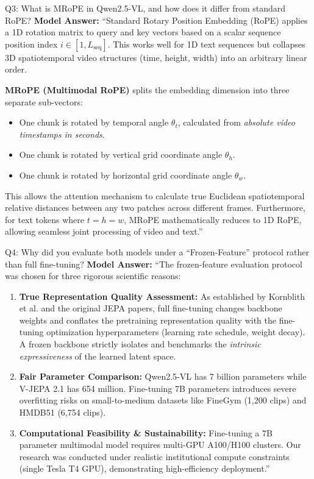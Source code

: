 \documentclass[a4paper, 11pt]{article}
\begin{document}
\vspace{0.2cm}

\begin{defensebox}{Q3: What is MRoPE in Qwen2.5-VL, and how does it differ from standard RoPE?}
\textbf{Model Answer:}
``Standard Rotary Position Embedding (RoPE) applies a 1D rotation matrix to query and key vectors based on a scalar sequence position index $i \in [1, L_{\text{seq}}]$. This works well for 1D text sequences but collapses 3D spatiotemporal video structures (time, height, width) into an arbitrary linear order.

\textbf{MRoPE (Multimodal RoPE)} splits the embedding dimension into three separate sub-vectors:
\begin{itemize}
    \item One chunk is rotated by temporal angle $\theta_t$, calculated from \emph{absolute video timestamps in seconds}.
    \item One chunk is rotated by vertical grid coordinate angle $\theta_h$.
    \item One chunk is rotated by horizontal grid coordinate angle $\theta_w$.
\end{itemize}
This allows the attention mechanism to calculate true Euclidean spatiotemporal relative distances between any two patches across different frames. Furthermore, for text tokens where $t=h=w$, MRoPE mathematically reduces to 1D RoPE, allowing seamless joint processing of video and text.''
\end{defensebox}

\vspace{0.2cm}

\begin{defensebox}{Q4: Why did you evaluate both models under a ``Frozen-Feature'' protocol rather than full fine-tuning?}
\textbf{Model Answer:}
``The frozen-feature evaluation protocol was chosen for three rigorous scientific reasons:
\begin{enumerate}
    \item \textbf{True Representation Quality Assessment:} As established by Kornblith et al. and the original JEPA papers, full fine-tuning changes backbone weights and conflates the pretraining representation quality with the fine-tuning optimization hyperparameters (learning rate schedule, weight decay). A frozen backbone strictly isolates and benchmarks the \emph{intrinsic expressiveness} of the learned latent space.
    \item \textbf{Fair Parameter Comparison:} Qwen2.5-VL has 7 billion parameters while V-JEPA 2.1 has 654 million. Fine-tuning 7B parameters introduces severe overfitting risks on small-to-medium datasets like FineGym (1,200 clips) and HMDB51 (6,754 clips).
    \item \textbf{Computational Feasibility \& Sustainability:} Fine-tuning a 7B parameter multimodal model requires multi-GPU A100/H100 clusters. Our research was conducted under realistic institutional compute constraints (single Tesla T4 GPU), demonstrating high-efficiency deployment.''
\end{enumerate}
\end{defensebox}
\end{document}
